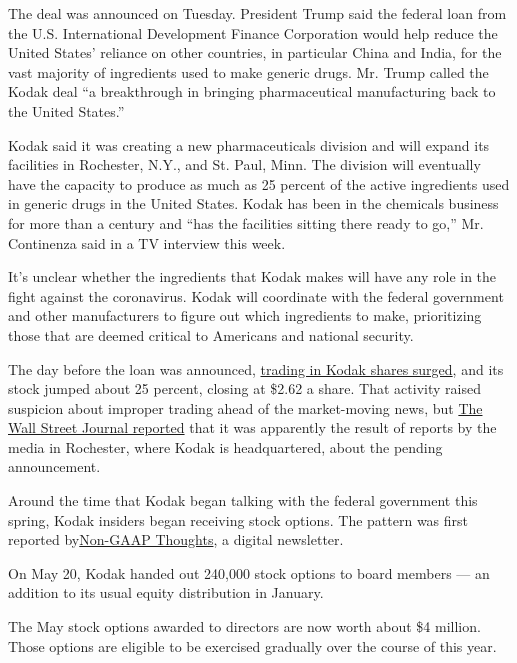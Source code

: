 The deal was announced on Tuesday. President Trump said the federal loan
from the U.S. International Development Finance Corporation would help
reduce the United States' reliance on other countries, in particular
China and India, for the vast majority of ingredients used to make
generic drugs. Mr. Trump called the Kodak deal ``a breakthrough in
bringing pharmaceutical manufacturing back to the United States.''

Kodak said it was creating a new pharmaceuticals division and will
expand its facilities in Rochester, N.Y., and St. Paul, Minn. The
division will eventually have the capacity to produce as much as 25
percent of the active ingredients used in generic drugs in the United
States. Kodak has been in the chemicals business for more than a century
and ``has the facilities sitting there ready to go,'' Mr. Continenza
said in a TV interview this week.

It's unclear whether the ingredients that Kodak makes will have any role
in the fight against the coronavirus. Kodak will coordinate with the
federal government and other manufacturers to figure out which
ingredients to make, prioritizing those that are deemed critical to
Americans and national security.

The day before the loan was announced,
\href{https://www.nytimes.com/2020/07/30/business/whats-up-with-kodak.html}{trading
in Kodak shares surged}, and its stock jumped about 25 percent, closing
at \$2.62 a share. That activity raised suspicion about improper trading
ahead of the market-moving news, but
\href{https://www.wsj.com/articles/tweets-and-articles-sent-kodak-shares-surging-before-official-announcement-11596056729}{The
Wall Street Journal reported} that it was apparently the result of
reports by the media in Rochester, where Kodak is headquartered, about
the pending announcement.

Around the time that Kodak began talking with the federal government
this spring, Kodak insiders began receiving stock options. The pattern
was first reported
by\href{https://nongaap.substack.com/p/corp-governance-dark-arts-part-5}{Non-GAAP
Thoughts}, a digital newsletter.

On May 20, Kodak handed out 240,000 stock options to board members ---
an addition to its usual equity distribution in January.

The May stock options awarded to directors are now worth about \$4
million. Those options are eligible to be exercised gradually over the
course of this year.


